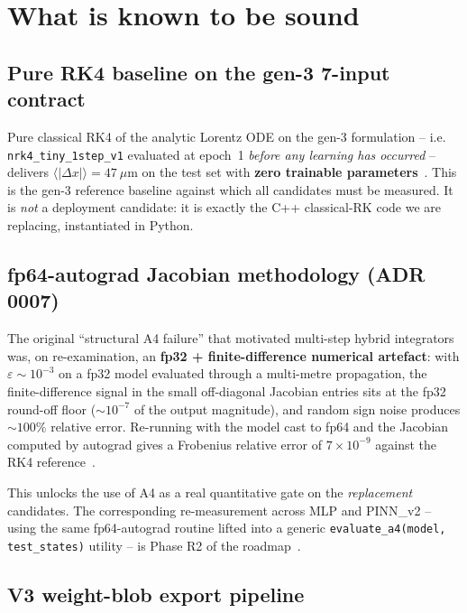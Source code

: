 \documentclass[11pt,a4paper]{article}
\begin{document}
\section{What is known to be sound}\label{sec:sound}

\subsection{Pure RK4 baseline on the gen-3 7-input contract}

Pure classical RK4 of the analytic Lorentz ODE on the gen-3
formulation -- i.e. \texttt{nrk4\_tiny\_1step\_v1} evaluated at
epoch~1 \emph{before any learning has occurred} -- delivers
$\langle|\Delta x|\rangle = 47~\mu$m on the test set with
\textbf{zero trainable parameters}~\cite{gen3readme}. This is the
gen-3 reference baseline against which all candidates must be
measured. It is \emph{not} a deployment candidate: it is exactly the
C++ classical-RK code we are replacing, instantiated in Python.

\subsection{fp64-autograd Jacobian methodology (ADR 0007)}\label{sec:adr0007}

The original ``structural A4 failure'' that motivated multi-step
hybrid integrators~\cite{adr0007} was, on re-examination, an
\textbf{fp32 + finite-difference numerical artefact}: with
$\varepsilon \sim 10^{-3}$ on a fp32 model evaluated through a
multi-metre propagation, the finite-difference signal in the small
off-diagonal Jacobian entries sits at the fp32 round-off floor
($\sim 10^{-7}$ of the output magnitude), and random sign noise
produces $\sim 100\%$ relative error. Re-running with the model cast
to fp64 and the Jacobian computed by autograd gives a Frobenius
relative error of $7\times 10^{-9}$ against the RK4
reference~\cite{adr0007}.

This unlocks the use of A4 as a real quantitative gate on the
\emph{replacement} candidates. The corresponding re-measurement
across MLP and PINN\_v2 -- using the same fp64-autograd routine
lifted into a generic \texttt{evaluate\_a4(model, test\_states)}
utility -- is Phase R2 of the
roadmap~\cite{replacementplan}.

\subsection{V3 weight-blob export pipeline}
\end{document}
